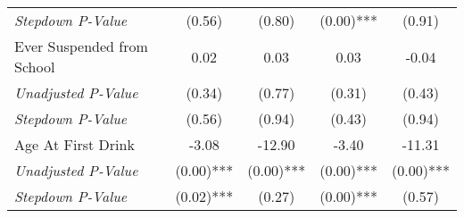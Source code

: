 \begin{tabular}{l c c c c}
\quad \textit{Stepdown P-Value} & (0.56) & (0.80) & (0.00)*** & (0.91) \\
Ever Suspended from School & 0.02 & 0.03 & 0.03 & -0.04 \\
\quad \textit{Unadjusted P-Value} & (0.34) & (0.77) & (0.31) & (0.43) \\
\quad \textit{Stepdown P-Value} & (0.56) & (0.94) & (0.43) & (0.94) \\
Age At First Drink & -3.08 & -12.90 & -3.40 & -11.31 \\
\quad \textit{Unadjusted P-Value} & (0.00)*** & (0.00)*** & (0.00)*** & (0.00)*** \\
\quad \textit{Stepdown P-Value} & (0.02)*** & (0.27) & (0.00)*** & (0.57) \\
\bottomrule
\end{tabular}
